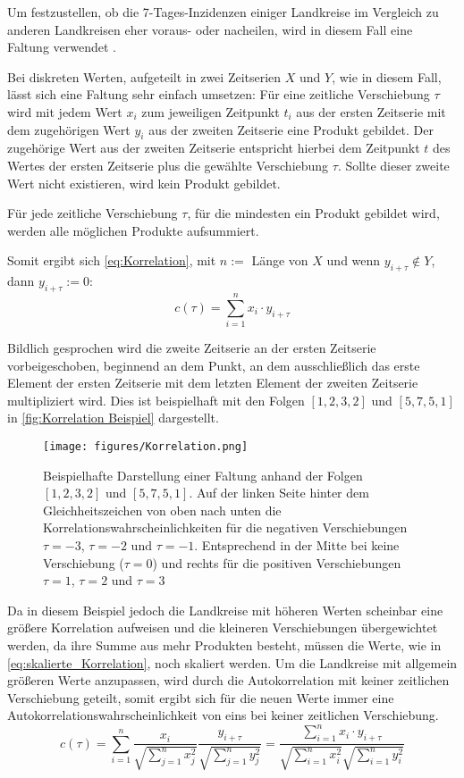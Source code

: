 Um festzustellen, ob die 7-Tages-Inzidenzen einiger Landkreise im Vergleich zu anderen Landkreisen eher voraus- oder nacheilen, wird in diesem Fall eine \glqq{}Faltung\grqq{} verwendet \autocite{Korrelation}.

Bei diskreten Werten, aufgeteilt in zwei Zeitserien $X$ und $Y$, wie in diesem Fall, lässt sich eine Faltung sehr einfach umsetzen:
Für eine zeitliche Verschiebung $\tau$ wird mit jedem Wert $x_i$ zum jeweiligen Zeitpunkt $t_i$ aus der ersten Zeitserie mit dem zugehörigen Wert $y_i$ aus der zweiten Zeitserie eine Produkt gebildet. Der zugehörige Wert aus der zweiten Zeitserie entspricht hierbei dem Zeitpunkt $t$ des Wertes der ersten Zeitserie plus die gewählte Verschiebung $\tau$. Sollte dieser zweite Wert nicht existieren, wird kein Produkt gebildet.

Für jede zeitliche Verschiebung $\tau$, für die mindesten ein Produkt gebildet wird, werden alle möglichen Produkte aufsummiert.

Somit ergibt sich \autoref{eq:Korrelation}, mit $n := $ Länge von $X$ und wenn $y_{i+\tau} \not\in Y$, dann $y_{i+\tau} := 0$:
\begin{equation}\label{eq:Korrelation}
    c(\tau) = \sum_{i=1}^n x_i\cdot y_{i+\tau}
\end{equation}


Bildlich gesprochen wird die zweite Zeitserie an der ersten Zeitserie vorbeigeschoben, beginnend an dem Punkt, an dem ausschließlich das erste Element der ersten Zeitserie mit dem letzten Element der zweiten Zeitserie multipliziert wird. Dies ist beispielhaft mit den Folgen $[1,2,3,2]$ und $[5,7,5,1]$ in \autoref{fig:Korrelation Beispiel} dargestellt.

\begin{figure}
    \centering
    \texttt{[image: figures/Korrelation.png]}
    \caption{Beispielhafte Darstellung einer Faltung anhand der Folgen $[1,2,3,2]$ und $[5,7,5,1]$. Auf der linken Seite hinter dem Gleichheitszeichen von oben nach unten die Korrelationswahrscheinlichkeiten für die negativen Verschiebungen $\tau=-3$, $\tau=-2$ und $\tau=-1$. Entsprechend in der Mitte bei keine Verschiebung ($\tau=0$) und rechts für die positiven Verschiebungen $\tau=1$, $\tau=2$ und $\tau=3$}
    \label{fig:Korrelation Beispiel}
\end{figure}

Da in diesem Beispiel jedoch die Landkreise mit höheren Werten scheinbar eine größere Korrelation aufweisen und die kleineren Verschiebungen übergewichtet werden, da ihre Summe aus mehr Produkten besteht, müssen die Werte, wie in \autoref{eq:skalierte_Korrelation}, noch skaliert werden.
Um die Landkreise mit allgemein größeren Werte anzupassen, wird durch die Autokorrelation mit keiner zeitlichen Verschiebung
geteilt, somit ergibt sich für die neuen Werte immer eine Autokorrelationswahrscheinlichkeit von eins bei keiner zeitlichen Verschiebung.
\begin{equation}\label{eq:skalierte_Korrelation}
    c(\tau) =\sum_{i=1}^n \frac{x_i}{\sqrt{\sum_{j=1}^n x_j^2}}
    \frac{y_{i+\tau}}{\sqrt{\sum_{j=1}^n y_j^2}}= 
    \frac{\sum_{i=1}^n x_i\cdot y_{i+\tau}}{\sqrt{\sum_{i=1}^n x_i^2}\sqrt{\sum_{i=1}^n y_i^2}}
\end{equation}

